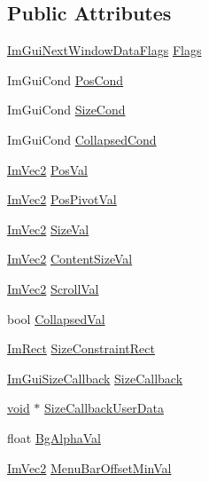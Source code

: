 \subsection*{Public Attributes}
\begin{DoxyCompactItemize}
\item 
\hyperlink{imgui__internal_8h_a55b45c183ddf8a1b8a70fbce77fa5d26}{Im\+Gui\+Next\+Window\+Data\+Flags} \hyperlink{structImGuiNextWindowData_a9c92b3e6b1c0c89a9d9ec8430c58af88}{Flags}
\item 
Im\+Gui\+Cond \hyperlink{structImGuiNextWindowData_adb6dfd7cba17293b0610afa0d16d9491}{Pos\+Cond}
\item 
Im\+Gui\+Cond \hyperlink{structImGuiNextWindowData_a2a34b7d39111d51f8309eb886575d47d}{Size\+Cond}
\item 
Im\+Gui\+Cond \hyperlink{structImGuiNextWindowData_a864d3d1bf0dbf81ba4cf9cefd75fe06b}{Collapsed\+Cond}
\item 
\hyperlink{structImVec2}{Im\+Vec2} \hyperlink{structImGuiNextWindowData_aacc1478ee81850d0d6aff6569469911d}{Pos\+Val}
\item 
\hyperlink{structImVec2}{Im\+Vec2} \hyperlink{structImGuiNextWindowData_a334b4a364e72d96277a1d7d9d3c5474c}{Pos\+Pivot\+Val}
\item 
\hyperlink{structImVec2}{Im\+Vec2} \hyperlink{structImGuiNextWindowData_af399c9c679b8f9c315af8583bf63aa68}{Size\+Val}
\item 
\hyperlink{structImVec2}{Im\+Vec2} \hyperlink{structImGuiNextWindowData_a050058f58709d637bc6a0468ee48548f}{Content\+Size\+Val}
\item 
\hyperlink{structImVec2}{Im\+Vec2} \hyperlink{structImGuiNextWindowData_ae6b6651b219549de2844261363be5d75}{Scroll\+Val}
\item 
bool \hyperlink{structImGuiNextWindowData_a0c4c81bf78a6ac094f794d2cf318037a}{Collapsed\+Val}
\item 
\hyperlink{structImRect}{Im\+Rect} \hyperlink{structImGuiNextWindowData_a63e7f1aa93d6bf9eed7452d57d3930c9}{Size\+Constraint\+Rect}
\item 
\hyperlink{imgui_8h_a1cccf55557c2153a9d4af6db73dc3a91}{Im\+Gui\+Size\+Callback} \hyperlink{structImGuiNextWindowData_acab3905da227922b52f03943b355b27a}{Size\+Callback}
\item 
\hyperlink{imgui__impl__opengl3__loader_8h_ac668e7cffd9e2e9cfee428b9b2f34fa7}{void} $\ast$ \hyperlink{structImGuiNextWindowData_a3b80639b573e9a009da8aa9f9ca1a250}{Size\+Callback\+User\+Data}
\item 
float \hyperlink{structImGuiNextWindowData_a3597005fb1cdd4d3fa06296bbbb5a2c2}{Bg\+Alpha\+Val}
\item 
\hyperlink{structImVec2}{Im\+Vec2} \hyperlink{structImGuiNextWindowData_ab2b226f215bfdf2639f620e6d84157f6}{Menu\+Bar\+Offset\+Min\+Val}
\end{DoxyCompactItemize}


